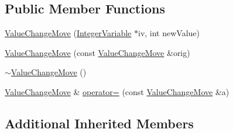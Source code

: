 \subsection*{Public Member Functions}
\begin{DoxyCompactItemize}
\item 
\hyperlink{class_value_change_move_acc99c9e1bb0ee0de467eccad1f6a5b82}{Value\-Change\-Move} (\hyperlink{class_integer_variable}{Integer\-Variable} $\ast$iv, int new\-Value)
\item 
\hyperlink{class_value_change_move_aece5e02665f3c8b99de2398f3f5f1908}{Value\-Change\-Move} (const \hyperlink{class_value_change_move}{Value\-Change\-Move} \&orig)
\item 
\hyperlink{class_value_change_move_a3b39bee115ac86227411c76723715907}{$\sim$\-Value\-Change\-Move} ()
\item 
\hyperlink{class_value_change_move}{Value\-Change\-Move} \& \hyperlink{class_value_change_move_ae6242fe996cf5df1de8a65db5921f397}{operator=} (const \hyperlink{class_value_change_move}{Value\-Change\-Move} \&a)
\end{DoxyCompactItemize}
\subsection*{Additional Inherited Members}


